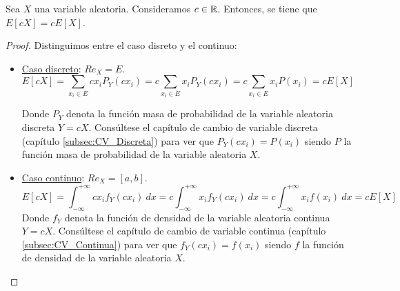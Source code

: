 \begin{prop}
    Sea $X$ una variable aleatoria. Consideramos $c \in \mathbb R$. Entonces, se tiene que $E[cX] = cE[X]$.
\end{prop}
\begin{proof}
    Distinguimos entre el caso disreto y el continuo:
    \begin{itemize}
        \item \underline{Caso discreto}: $Re_X = E$.
        $$E[cX] = \sum_{x_i \in E} c x_i P_Y(c x_i) = c \sum_{x_i \in E} x_i P_Y(c  x_i) = c
        \sum_{x_i \in E} x_i P(x_i) = cE[X]$$
        
        Donde $P_Y$ denota la función masa de probabilidad de la variable aleatoria discreta $Y=cX$. Consúltese el capítulo de cambio de variable discreta (capítulo \ref{subsec:CV_Discreta}) para ver que $P_Y(cx_i) = P(x_i)$ siendo $P$ la función masa de probabilidad de la variable aleatoria $X$.

        \item \underline{Caso continuo}: $Re_X = [a,b]$.
        $$E[cX] = \int_{-\infty}^{+\infty} cx_i f_Y(cx_i)~dx = c \int_{-\infty}^{+\infty} x_i f_Y(cx_i)~dx = c \int_{-\infty}^{+\infty} x_i f(x_i)~dx = cE[X]$$
        Donde $f_Y$ denota la función de densidad de la variable aleatoria continua $Y=cX$. Consúltese el capítulo de cambio de variable continua (capítulo \ref{subsec:CV_Continua}) para ver que $f_Y(cx_i) = f(x_i)$ siendo $f$ la función de densidad de la variable aleatoria $X$.
    \end{itemize}
\end{proof}

